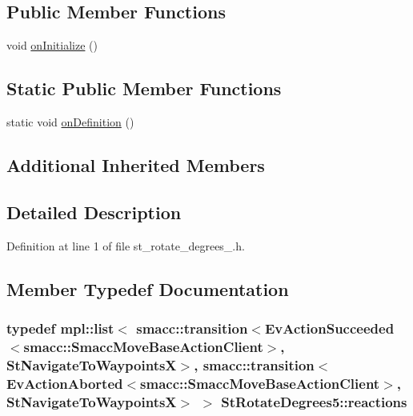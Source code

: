 \subsection*{Public Member Functions}
\begin{DoxyCompactItemize}
\item 
void \hyperlink{structStRotateDegrees5_ae97bf7a4c7a7f270bc29642cfd4d49d3}{on\+Initialize} ()
\end{DoxyCompactItemize}
\subsection*{Static Public Member Functions}
\begin{DoxyCompactItemize}
\item 
static void \hyperlink{structStRotateDegrees5_ab6978857d7e45392f393bb9a0d6c073d}{on\+Definition} ()
\end{DoxyCompactItemize}
\subsection*{Additional Inherited Members}


\subsection{Detailed Description}


Definition at line 1 of file st\+\_\+rotate\+\_\+degrees\+\_.\+h.



\subsection{Member Typedef Documentation}
\subsubsection[{\texorpdfstring{reactions}{reactions}}]{\setlength{\rightskip}{0pt plus 5cm}typedef mpl\+::list$<$ {\bf smacc\+::transition}$<$Ev\+Action\+Succeeded$<${\bf smacc\+::\+Smacc\+Move\+Base\+Action\+Client}$>$, {\bf St\+Navigate\+To\+WaypointsX}$>$, {\bf smacc\+::transition}$<$Ev\+Action\+Aborted$<${\bf smacc\+::\+Smacc\+Move\+Base\+Action\+Client}$>$, {\bf St\+Navigate\+To\+WaypointsX}$>$ $>$ {\bf St\+Rotate\+Degrees5\+::reactions}}\hypertarget{structStRotateDegrees5_a0551430b067639f0b803a001f98f76a9}{}\label{structStRotateDegrees5_a0551430b067639f0b803a001f98f76a9}


